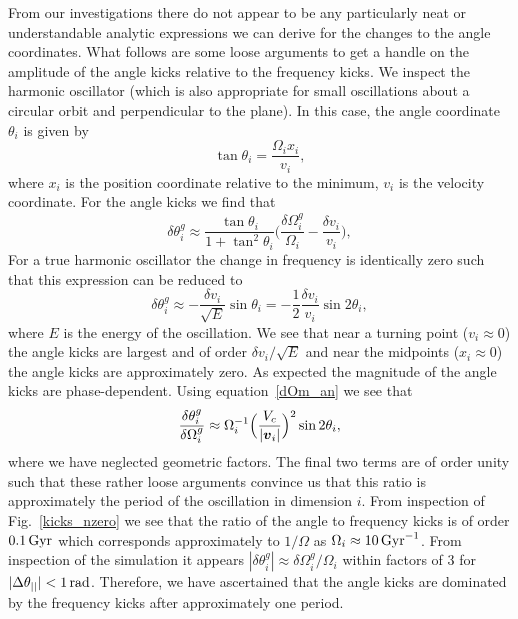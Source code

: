 \documentclass[useAMS,usenatbib,fleqn,a4paper]{mn2e}
\def\rad{\,\rm rad}
\def\Gyr{\,{\rm Gyr}}
\newcommand{\bs}[1]{\bmath{#1}}
\begin{document}
From our investigations there do not appear to be any particularly neat or understandable analytic expressions we can derive for the changes to the angle coordinates. What follows are some loose arguments to get a handle on the amplitude of the angle kicks relative to the frequency kicks. We inspect the harmonic oscillator (which is also appropriate for small oscillations about a circular orbit and perpendicular to the plane). In this case, the angle coordinate $\theta_i$ is given by
\begin{equation}
\tan\theta_i = \frac{\Omega_i x_i}{v_i},
\end{equation}
where $x_i$ is the position coordinate relative to the minimum, $v_i$ is the velocity coordinate. For the angle kicks we find that
\begin{equation}
\delta\theta^g_i\approx \frac{\tan\theta_i}{1+\tan^2\theta_i}\Big(\frac{\delta\Omega^g_i}{\Omega_i}-\frac{\delta v_i}{v_i}\Big),
\end{equation}
For a true harmonic oscillator the change in frequency is identically zero such that this expression can be reduced to
\begin{equation}
\delta\theta^g_i\approx -\frac{\delta v_i}{\sqrt{E}}\sin\theta_i = -\frac{1}{2}\frac{\delta v_i}{v_i}\sin 2\theta_i,
\end{equation}
where $E$ is the energy of the oscillation. We see that near a turning point ($v_i\approx0$) the angle kicks are largest and of order $\delta v_i/\sqrt{E}$ and near the midpoints ($x_i\approx0$) the angle kicks are approximately zero. As expected the magnitude of the angle kicks are phase-dependent. Using equation~\eqref{dOm_an} we see that
\begin{equation}
\frac{\delta\theta_i^g}{\delta\Omega_i^g}\approx\Omega_i^{-1}\Big(\frac{V_c}{|\bs{v}_i|}\Big)^2\sin 2\theta_i,
\end{equation}
where we have neglected geometric factors. The final two terms are of order unity such that these rather loose arguments convince us that this ratio is approximately the period of the oscillation in dimension $i$. From inspection of Fig.~\ref{kicks_nzero} we see that the ratio of the angle to frequency kicks is of order $0.1\Gyr$ which corresponds approximately to $1/\Omega$ as $\Omega_i\approx10\Gyr^{-1}$. From inspection of the simulation it appears $|\delta\theta^g_i|\approx\delta\Omega^g_i/\Omega_i$ within factors of $3$ for $|\Delta\theta_{||}|<1\rad$. Therefore, we have ascertained that the angle kicks are dominated by the frequency kicks after approximately one period.
\end{document}
